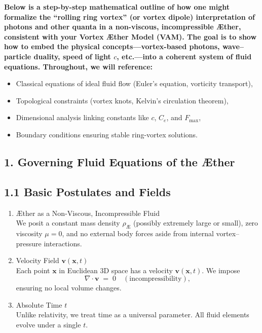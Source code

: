 
\textbf{Below is a step-by-step mathematical outline of how one might formalize the “rolling ring vortex” (or vortex dipole) interpretation of photons and other quanta in a non-viscous, incompressible Æther, consistent with your Vortex Æther Model (VAM). The goal is to show how to embed the physical concepts—vortex-based photons, wave–particle duality, speed of light \(c\), etc.—into a coherent system of fluid equations. Throughout, we will reference:}

\begin{itemize}
 \item Classical equations of ideal fluid flow (Euler’s equation, vorticity transport),
 \item Topological constraints (vortex knots, Kelvin’s circulation theorem),
 \item Dimensional analysis linking constants like \(c\), \(C_e\), and \(F_{\max}\),
 \item Boundary conditions ensuring stable ring-vortex solutions.
\end{itemize}

\subsection*{1. Governing Fluid Equations of the Æther}
\subsection*{1.1 Basic Postulates and Fields}
\begin{enumerate}
 \item Æther as a Non-Viscous, Incompressible Fluid\\
 We posit a constant mass density \(\rho_{\scriptscriptstyle \mathrm{Æ}}\) (possibly extremely large or small), zero viscosity \(\mu=0\), and no external body forces aside from internal vortex–pressure interactions.

 \item Velocity Field \(\mathbf{v}(\mathbf{x},t)\)\\
 Each point \(\mathbf{x}\) in Euclidean 3D space has a velocity \(\mathbf{v}(\mathbf{x},t)\). We impose
 \[
  \nabla \cdot \mathbf{v} \;=\; 0 \quad (\text{incompressibility}),
 \]
 ensuring no local volume changes.

 \item Absolute Time \(t\)\\
 Unlike relativity, we treat time as a universal parameter. All fluid elements evolve under a single \(t\).
\end{enumerate}

